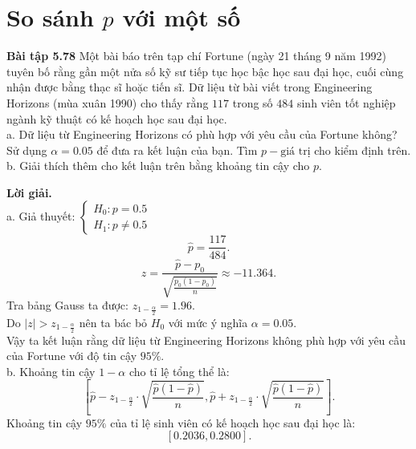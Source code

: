 \section{So sánh $p$ với một số}
\begin{mybox}
\textbf{Bài tập 5.78} Một bài báo trên tạp chí Fortune (ngày 21 tháng 9 năm 1992) tuyên bố rằng gần một nửa số kỹ sư tiếp tục học bậc học sau đại học, cuối cùng nhận được bằng thạc sĩ hoặc tiến sĩ. Dữ liệu từ bài viết trong Engineering Horizons (mùa xuân 1990) cho thấy rằng $117$ trong số $484$ sinh viên tốt nghiệp ngành kỹ thuật có kế hoạch học sau đại học.\\
a. Dữ liệu từ Engineering Horizons có phù hợp với yêu cầu của Fortune không? Sử dụng $\alpha = 0.05$ để đưa ra kết luận của bạn. Tìm $p-\text{giá trị}$ cho kiểm định trên.\\
b. Giải thích thêm cho kết luận trên bằng khoảng tin cậy cho $p.$
\end{mybox}
\textbf{Lời giải.}\\
a. Giả thuyết: $\begin{cases}
H_0: p = 0.5\\
H_1: p \ne 0.5
\end{cases}$\\
$$\widehat{p} = \frac{117}{484}.$$
$$z = \frac{{\widehat p - {p_0}}}{{\sqrt {\frac{{{p_0}\left( {1 - {p_0}} \right)}}{n}} }} \approx  - 11.364.$$
Tra bảng Gauss ta được: $z_{1 - \frac{\alpha}{2}} = 1.96.$\\
Do $\left| {z} \right| > z_{1 - \frac{\alpha}{2}}$ nên ta bác bỏ $H_0$ với mức ý nghĩa $\alpha = 0.05.$\\
Vậy ta kết luận rằng dữ liệu từ Engineering Horizons không phù hợp với yêu cầu của Fortune với độ tin cậy $95\%$.\\
b. Khoảng tin cậy $1 - \alpha$ cho tỉ lệ tổng thể là:
$$\left[ {\widehat{p} - z_{1 - \frac{\alpha}{2}} \cdot \sqrt{\frac{\widehat{p} \left( {1 - \widehat{p}} \right)}{n}}, \widehat{p} + z_{1 - \frac{\alpha}{2}} \cdot \sqrt{\frac{\widehat{p} \left( {1 - \widehat{p}} \right)}{n}}} \right].$$
Khoảng tin cậy $95\%$ của tỉ lệ sinh viên có kế hoạch học sau đại học là:
$$\left[ {0.2036, 0.2800} \right].$$

